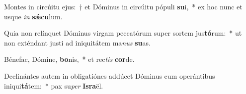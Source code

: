 \item Montes in circúitu ejus:~† et Dóminus in circúitu pópuli \textbf{su}i,~* ex hoc nunc et usque \textit{in} \textbf{sǽ}\textbf{cu}lum.
\item Quia non relínquet Dóminus virgam peccatórum super sortem jus\textbf{tó}rum:~* ut non exténdant justi ad iniquitátem ma\textit{nus} \textbf{su}as.
\item Bénefac, Dómine, \textbf{bo}nis,~* et rec\textit{tis} \textbf{cor}de.
\item Declinántes autem in obligatiónes addúcet Dóminus cum operántibus iniqui\textbf{tá}tem:~* pax su\textit{per} \textbf{Is}\textbf{ra}ël.
